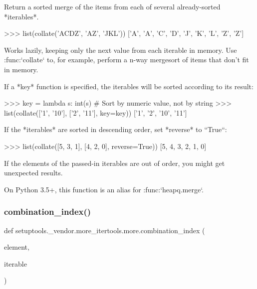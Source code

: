 \begin{DoxyVerb}Return a sorted merge of the items from each of several already-sorted
*iterables*.

    >>> list(collate('ACDZ', 'AZ', 'JKL'))
    ['A', 'A', 'C', 'D', 'J', 'K', 'L', 'Z', 'Z']

Works lazily, keeping only the next value from each iterable in memory. Use
:func:`collate` to, for example, perform a n-way mergesort of items that
don't fit in memory.

If a *key* function is specified, the iterables will be sorted according
to its result:

    >>> key = lambda s: int(s)  # Sort by numeric value, not by string
    >>> list(collate(['1', '10'], ['2', '11'], key=key))
    ['1', '2', '10', '11']


If the *iterables* are sorted in descending order, set *reverse* to
``True``:

    >>> list(collate([5, 3, 1], [4, 2, 0], reverse=True))
    [5, 4, 3, 2, 1, 0]

If the elements of the passed-in iterables are out of order, you might get
unexpected results.

On Python 3.5+, this function is an alias for :func:`heapq.merge`.\end{DoxyVerb}
 \mbox{\label{namespacesetuptools_1_1__vendor_1_1more__itertools_1_1more_afee4a99a5bd0ab33a46c0d2d1574aca3}} 
\subsubsection{\texorpdfstring{combination\+\_\+index()}{combination\_index()}}
{\footnotesize\ttfamily def setuptools.\+\_\+vendor.\+more\+\_\+itertools.\+more.\+combination\+\_\+index (\begin{DoxyParamCaption}\item[{}]{element,  }\item[{}]{iterable }\end{DoxyParamCaption})}

